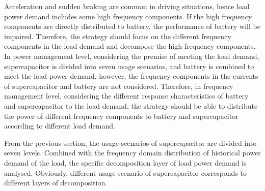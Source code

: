 \documentclass[energies,article,submit,moreauthors,pdftex,10pt,a4paper]{Definitions/mdpi}
\begin{document}
Acceleration and sudden braking are common in driving situations, hence load power demand includes some high frequency components. If the high frequency components are directly distributed to battery, the performance of battery will be impaired. Therefore, the strategy should focus on the different frequency components in the load demand and decompose the high frequency components.
In power management level, considering the premise of meeting the load demand, supercapacitor is divided into seven usage scenarios, and battery is combined  to meet the load power demand, however, the frequency components in the currents of supercapacitor and battery are not considered.
Therefore, in frequency management level, considering the different response characteristics of battery and supercapacitor to the load demand, the strategy should be able to distribute the power of different frequency components to battery and supercapacitor according to different load demand.


From the previous section, the usage scenarios of supercapacitor are divided into seven levels. Combined with the frequency domain distribution of historical power demand of the load, the specific decomposition layer of load power demand is analysed. Obviously,  different usage scenario of supercapacitor corresponds to different layers of decomposition.
\end{document}
